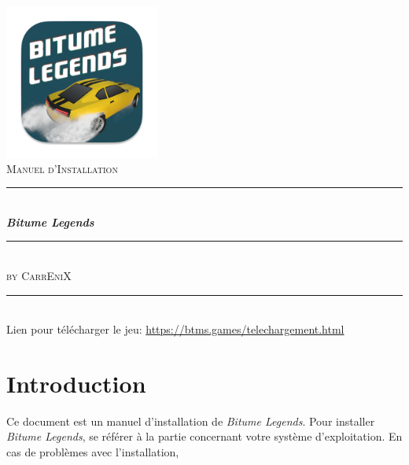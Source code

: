 \documentclass[a4paper,12pt]{article}
\newcommand{\HRule}{\rule{\linewidth}{0.5mm}}
\newcommand{\btmlgs}{\textsl{Bitume Legends}}
\newcommand{\CEX}{\textsc{CarrEniX}}
\newcommand{\report}{Manuel d'Installation}
\begin{document}
    \begin{titlepage}
        \begin{center}
            \includegraphics[scale=0.7]{logo192.png}\\[0.5cm]
            \textsc{\Large \report}\\[1.5cm]

            \HRule \\[0.4cm]
            { \LARGE \bfseries \btmlgs \\[0.4cm] }

            \HRule \\[2cm]
        
            \textsc{by \Large \CEX}\\[1.5cm]
        \end{center}
        \tableofcontents
        \begin{center}
            \HRule\\
            Lien pour télécharger le jeu: \url{https://btms.games/telechargement.html}
        \end{center}
    \end{titlepage}

    \section*{Introduction}
        Ce document est un manuel d'installation de \btmlgs.
        Pour installer \btmlgs, se référer à la partie concernant votre système d'exploitation.
        En cas de problèmes avec l'installation, 
\end{document}
